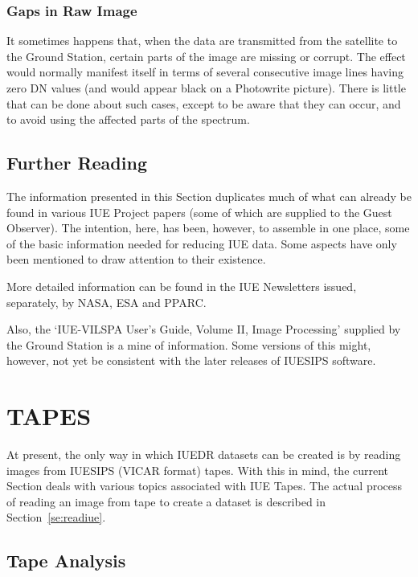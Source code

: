 \subsubsection{Gaps in Raw Image}

It sometimes happens that, when the data are transmitted from the
satellite to the Ground Station, certain parts of the image are missing
or corrupt.  The effect would normally manifest itself in terms of
several consecutive image lines having zero DN values (and would appear black
on a Photowrite picture)\@.  There is little that can be done about such cases,
except to be aware that they can occur, and to avoid using the affected parts
of the spectrum.


\subsection{Further Reading}

The information presented in this Section duplicates much of what can already
be found in various IUE Project papers (some of which are supplied to the
Guest Observer)\@.  The intention, here, has been, however, to assemble
in one place, some of the basic information needed for reducing IUE data.
Some aspects have only been mentioned to draw attention to their existence.

More detailed information can be found in the IUE Newsletters issued,
separately, by NASA, ESA and PPARC\@.

Also, the `IUE-VILSPA User's Guide, Volume II, Image Processing' supplied by
the Ground Station is a mine of information.  Some versions of this
might, however, not yet be consistent with the later releases of IUESIPS
software.


\section{\label{se:tapes}TAPES}

At present, the only way in which IUEDR datasets can be created is by reading
images from IUESIPS (VICAR format) tapes.  With this in mind, the current
Section deals with various topics associated with IUE Tapes.  The actual
process of reading an image from tape to create a dataset is described in
Section~\ref{se:readiue}\@.


\subsection{\label{subse:tape_anal}Tape Analysis}

